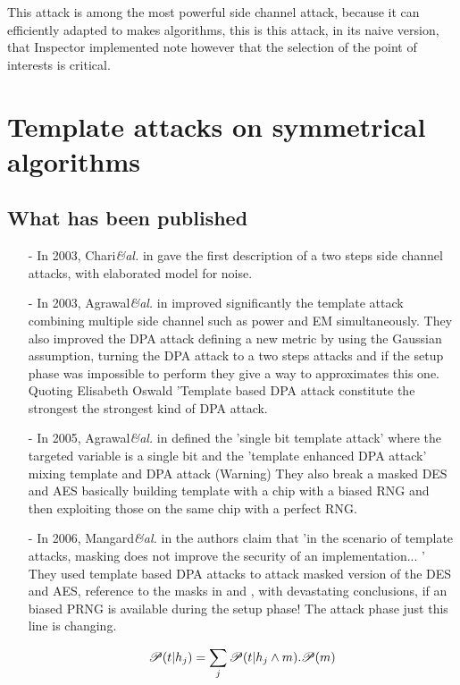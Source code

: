This attack is among the most powerful side channel attack, because it can efficiently adapted to makes algorithms,
this is this attack, in its naive version, that Inspector implemented note however that the selection of the point 
of interests is critical.


\section{Template attacks on symmetrical algorithms}
\subsection*{What has been published}
\begin{itemize}  
	\item[-] In 2003, Chari\textit{\&al.} in 
gave the first description of a two steps side channel attacks, with elaborated model for noise.

	\item[-] In 2003, Agrawal\textit{\&al.} in 
improved significantly the template attack combining multiple side channel 
such as power and EM simultaneously.
They also improved the DPA attack defining a new metric by using the Gaussian assumption, turning 
	 the DPA attack to a two steps attacks and if the setup  phase was impossible to perform
	they give a way to approximates this one. Quoting Elisabeth Oswald 'Template based DPA attack 
	constitute the strongest the strongest kind of DPA attack.
			  
	\item[-] In 2005, Agrawal\textit{\&al.} in 
defined the 'single bit template attack' where the targeted variable is a single bit
and the 'template enhanced DPA attack' mixing template and DPA attack (Warning)	 
They also break a masked DES and AES basically building template with a chip with a biased RNG 
and then exploiting those on the same chip with a perfect RNG.


	\item[-] In 2006, Mangard\textit{\&al.} in 
the authors claim that 'in the scenario of template attacks, masking does not improve the security of an implementation... '
They used template based DPA attacks to attack masked version of the DES and AES, 
reference to the masks in  and 
,
with devastating conclusions, if an biased PRNG is available during the setup phase!
The attack phase just this line is changing.
\begin{center}$$\mbox{\huge}{ \mathscr{P}(t | h_j ) = 
{ \sum_j \mathscr{P}(t | h_j \wedge m).\mathscr{P}(m) } }  $$
\end{center} 


\end{itemize}
